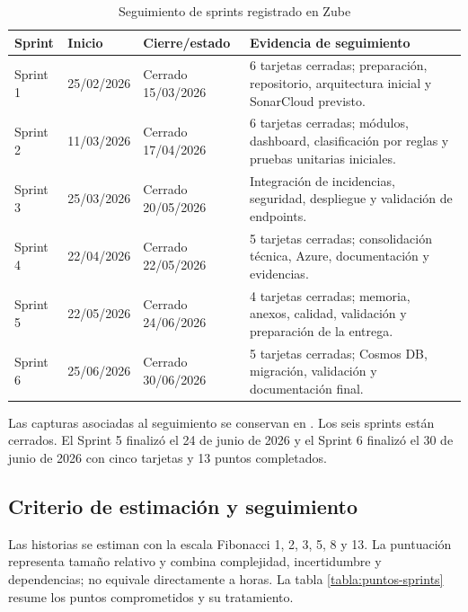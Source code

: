 \begin{table}[h]
\centering
\small
\begin{tabularx}{\textwidth}{l l l X}
\textbf{Sprint} & \textbf{Inicio} & \textbf{Cierre/estado} & \textbf{Evidencia de seguimiento} \\
\hline
Sprint 1 & 25/02/2026 & Cerrado 15/03/2026 & 6 tarjetas cerradas; preparación, repositorio, arquitectura inicial y SonarCloud previsto. \\
Sprint 2 & 11/03/2026 & Cerrado 17/04/2026 & 6 tarjetas cerradas; módulos, dashboard, clasificación por reglas y pruebas unitarias iniciales. \\
Sprint 3 & 25/03/2026 & Cerrado 20/05/2026 & Integración de incidencias, seguridad, despliegue y validación de endpoints. \\
Sprint 4 & 22/04/2026 & Cerrado 22/05/2026 & 5 tarjetas cerradas; consolidación técnica, Azure, documentación y evidencias. \\
Sprint 5 & 22/05/2026 & Cerrado 24/06/2026 & 4 tarjetas cerradas; memoria, anexos, calidad, validación y preparación de la entrega. \\
Sprint 6 & 25/06/2026 & Cerrado 30/06/2026 & 5 tarjetas cerradas; Cosmos DB, migración, validación y documentación final. \\
\end{tabularx}
\caption{Seguimiento de sprints registrado en Zube}
\label{tabla:seguimiento_zube}
\end{table}

Las capturas asociadas al seguimiento se conservan en . Los seis sprints están cerrados. El Sprint 5 finalizó el 24 de junio de 2026 y el Sprint 6 finalizó el 30 de junio de 2026 con cinco tarjetas y 13 puntos completados.

\subsection{Criterio de estimación y seguimiento}

Las historias se estiman con la escala Fibonacci 1, 2, 3, 5, 8 y 13. La puntuación representa tamaño relativo y combina complejidad, incertidumbre y dependencias; no equivale directamente a horas. La tabla \ref{tabla:puntos-sprints} resume los puntos comprometidos y su tratamiento.

